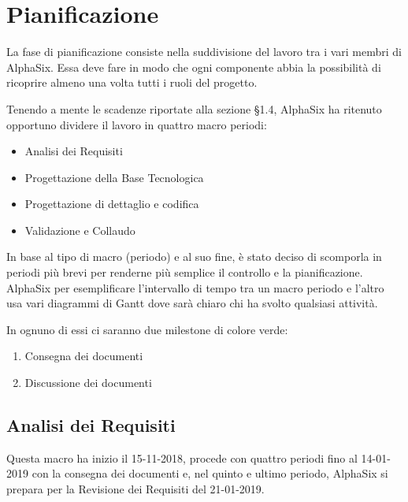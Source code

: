\newpage
\section{Pianificazione}\label{Pianificazione}
    La fase di pianificazione consiste nella suddivisione del lavoro tra i vari membri di AlphaSix. Essa deve fare in modo che ogni componente abbia la possibilità di ricoprire almeno una volta tutti i ruoli del progetto.
    
    Tenendo a mente le scadenze riportate alla sezione §1.4, AlphaSix ha ritenuto opportuno dividere il lavoro in quattro macro periodi:
	\begin{itemize}
	\item Analisi dei Requisiti
	\item Progettazione della Base Tecnologica
	\item Progettazione di dettaglio e codifica
	\item Validazione e Collaudo
	\end{itemize}
    
    In base al tipo di macro (periodo) e al suo fine, è stato deciso di scomporla in periodi più brevi per renderne più semplice il
    controllo e la pianificazione. AlphaSix per esemplificare l'intervallo di tempo tra un macro periodo e l'altro usa vari
    diagrammi di Gantt dove sarà chiaro chi ha svolto qualsiasi attività.
    
    In ognuno di essi ci saranno due milestone di colore verde:
    
    \begin{enumerate}
    	\item Consegna dei documenti
    	\item Discussione dei documenti
    \end{enumerate}

    \subsection{Analisi dei Requisiti}
        Questa macro ha inizio il 15-11-2018, procede con quattro periodi fino al 14-01-2019 con la consegna dei documenti e, nel
        quinto e ultimo  periodo, AlphaSix si prepara per la Revisione dei Requisiti del 21-01-2019.
        
